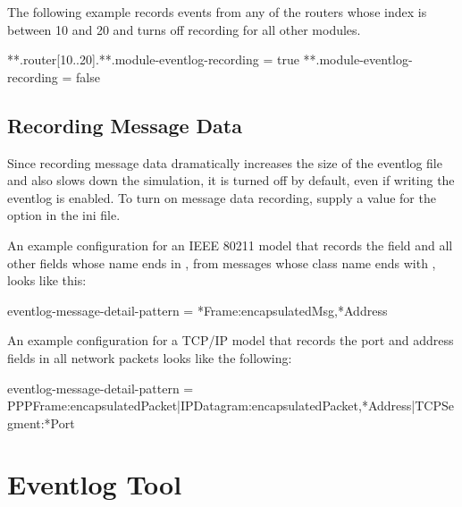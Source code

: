 The following example records events from any of the routers whose index is
between 10 and 20 and turns off recording for all other modules.

\begin{inifile}
**.router[10..20].**.module-eventlog-recording = true
**.module-eventlog-recording = false
\end{inifile}

\subsection{Recording Message Data}
\label{sec:eventlog:recording-messages}

Since recording message data dramatically increases the size of the eventlog
file and also slows down the simulation, it is turned off by default, even if
writing the eventlog is enabled. To turn on message data recording, supply a
value for the  option in the ini file.



An example configuration for an IEEE 80211 model that records the
 field and all other fields whose name ends in
, from messages whose class name ends with , looks like
this:

\begin{inifile}
eventlog-message-detail-pattern = *Frame:encapsulatedMsg,*Address
\end{inifile}

An example configuration for a TCP/IP model that records the port and address
fields in all network packets looks like the following:

\begin{inifile}
eventlog-message-detail-pattern =
 PPPFrame:encapsulatedPacket|IPDatagram:encapsulatedPacket,*Address|TCPSegment:*Port
\end{inifile}

%


\section{Eventlog Tool}
\label{sec:eventlog:eventlog-tool}

